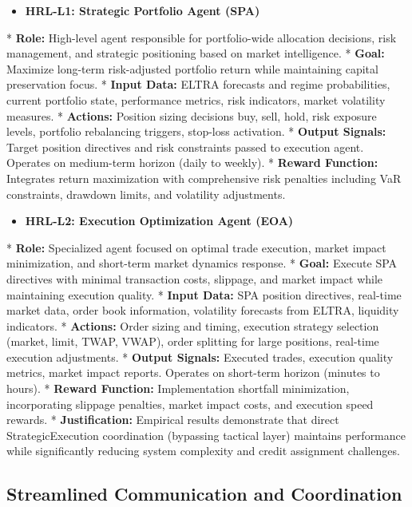 \documentclass[11pt]{article}
\begin{document}
\begin{itemize}
\item   \textbf{HRL-L1: Strategic Portfolio Agent (SPA)}
\end{itemize}
    *   \textbf{Role:} High-level agent responsible for portfolio-wide allocation decisions, risk management, and strategic positioning based on market intelligence.
    *   \textbf{Goal:} Maximize long-term risk-adjusted portfolio return while maintaining capital preservation focus.
    *   \textbf{Input Data:} ELTRA forecasts and regime probabilities, current portfolio state, performance metrics, risk indicators, market volatility measures.
    *   \textbf{Actions:} Position sizing decisions {buy, sell, hold}, risk exposure levels, portfolio rebalancing triggers, stop-loss activation.
    *   \textbf{Output Signals:} Target position directives and risk constraints passed to execution agent. Operates on medium-term horizon (daily to weekly).
    *   \textbf{Reward Function:} Integrates return maximization with comprehensive risk penalties including VaR constraints, drawdown limits, and volatility adjustments.
\begin{itemize}
\item   \textbf{HRL-L2: Execution Optimization Agent (EOA)}
\end{itemize}
    *   \textbf{Role:} Specialized agent focused on optimal trade execution, market impact minimization, and short-term market dynamics response.
    *   \textbf{Goal:} Execute SPA directives with minimal transaction costs, slippage, and market impact while maintaining execution quality.
    *   \textbf{Input Data:} SPA position directives, real-time market data, order book information, volatility forecasts from ELTRA, liquidity indicators.
    *   \textbf{Actions:} Order sizing and timing, execution strategy selection (market, limit, TWAP, VWAP), order splitting for large positions, real-time execution adjustments.
    *   \textbf{Output Signals:} Executed trades, execution quality metrics, market impact reports. Operates on short-term horizon (minutes to hours).
    *   \textbf{Reward Function:} Implementation shortfall minimization, incorporating slippage penalties, market impact costs, and execution speed rewards.
    *   \textbf{Justification:} Empirical results demonstrate that direct StrategicExecution coordination (bypassing tactical layer) maintains performance while significantly reducing system complexity and credit assignment challenges.

\subsection{Streamlined Communication and Coordination}
\end{document}
